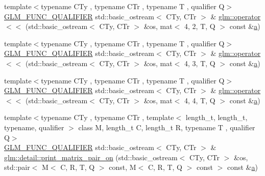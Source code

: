 \begin{DoxyCompactItemize}
\item 
{\footnotesize template$<$typename C\+Ty , typename C\+Tr , typename T , qualifier Q$>$ }\\\mbox{\hyperlink{setup_8hpp_a33fdea6f91c5f834105f7415e2a64407}{G\+L\+M\+\_\+\+F\+U\+N\+C\+\_\+\+Q\+U\+A\+L\+I\+F\+I\+ER}} std\+::basic\+\_\+ostream$<$ C\+Ty, C\+Tr $>$ \& \mbox{\hyperlink{group__gtx__io_gae565f5723d3912d17e295953290fd04b}{glm\+::operator$<$$<$}} (std\+::basic\+\_\+ostream$<$ C\+Ty, C\+Tr $>$ \&os, mat$<$ 4, 2, T, Q $>$ const \&\mbox{\hyperlink{_s_d_l__opengl__glext_8h_a3309789fc188587d666cda5ece79cf82}{a}})
\item 
{\footnotesize template$<$typename C\+Ty , typename C\+Tr , typename T , qualifier Q$>$ }\\\mbox{\hyperlink{setup_8hpp_a33fdea6f91c5f834105f7415e2a64407}{G\+L\+M\+\_\+\+F\+U\+N\+C\+\_\+\+Q\+U\+A\+L\+I\+F\+I\+ER}} std\+::basic\+\_\+ostream$<$ C\+Ty, C\+Tr $>$ \& \mbox{\hyperlink{group__gtx__io_ga203dc1828e9c231fed8dc8c000db2e17}{glm\+::operator$<$$<$}} (std\+::basic\+\_\+ostream$<$ C\+Ty, C\+Tr $>$ \&os, mat$<$ 4, 3, T, Q $>$ const \&\mbox{\hyperlink{_s_d_l__opengl__glext_8h_a3309789fc188587d666cda5ece79cf82}{a}})
\item 
{\footnotesize template$<$typename C\+Ty , typename C\+Tr , typename T , qualifier Q$>$ }\\\mbox{\hyperlink{setup_8hpp_a33fdea6f91c5f834105f7415e2a64407}{G\+L\+M\+\_\+\+F\+U\+N\+C\+\_\+\+Q\+U\+A\+L\+I\+F\+I\+ER}} std\+::basic\+\_\+ostream$<$ C\+Ty, C\+Tr $>$ \& \mbox{\hyperlink{group__gtx__io_ga269b4fa07fb9fe97faee573e9ccd9306}{glm\+::operator$<$$<$}} (std\+::basic\+\_\+ostream$<$ C\+Ty, C\+Tr $>$ \&os, mat$<$ 4, 4, T, Q $>$ const \&\mbox{\hyperlink{_s_d_l__opengl__glext_8h_a3309789fc188587d666cda5ece79cf82}{a}})
\item 
{\footnotesize template$<$typename C\+Ty , typename C\+Tr , template$<$ length\+\_\+t, length\+\_\+t, typename, qualifier $>$ class M, length\+\_\+t C, length\+\_\+t R, typename T , qualifier Q$>$ }\\\mbox{\hyperlink{setup_8hpp_a33fdea6f91c5f834105f7415e2a64407}{G\+L\+M\+\_\+\+F\+U\+N\+C\+\_\+\+Q\+U\+A\+L\+I\+F\+I\+ER}} std\+::basic\+\_\+ostream$<$ C\+Ty, C\+Tr $>$ \& \mbox{\hyperlink{namespaceglm_1_1detail_a5b82ceb67c3495960b07267d105170c5}{glm\+::detail\+::print\+\_\+matrix\+\_\+pair\+\_\+on}} (std\+::basic\+\_\+ostream$<$ C\+Ty, C\+Tr $>$ \&os, std\+::pair$<$ M$<$ C, R, T, Q $>$ const, M$<$ C, R, T, Q $>$ const $>$ const \&\mbox{\hyperlink{_s_d_l__opengl__glext_8h_a3309789fc188587d666cda5ece79cf82}{a}})

\end{DoxyCompactItemize}
